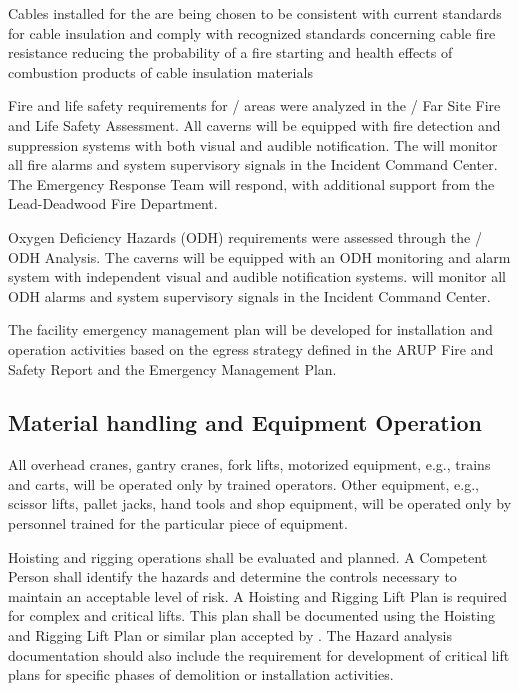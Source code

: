 Cables installed for the  are being chosen to be
consistent with current \fnal standards for cable insulation and
comply with recognized standards concerning cable fire resistance
reducing the probability of a fire starting and health effects of
combustion products of cable insulation materials

Fire and life safety requirements for / areas
were analyzed in the / Far Site Fire and Life
Safety Assessment. All caverns will be equipped with fire detection
and suppression systems with both visual and audible notification. The
\surf will monitor all fire alarms and system supervisory signals in
the \surf Incident Command Center.  The \surf Emergency Response Team
will respond, with additional support from the Lead-Deadwood Fire
Department.

Oxygen Deficiency Hazards (ODH) requirements were assessed through the
/ ODH Analysis. The caverns will be equipped
with an ODH monitoring and alarm system with independent visual and
audible notification systems. \surf will monitor all ODH alarms and
system supervisory signals in the \surf Incident Command Center.

The facility emergency management plan will be developed for
installation and operation activities based on the egress strategy
defined in the ARUP Fire and Safety Report and the \surf Emergency
Management Plan.

\subsection{Material handling and Equipment Operation}

All overhead cranes, gantry cranes, fork lifts, motorized equipment,
e.g., trains and carts, will be operated only by trained
operators. Other equipment, e.g., scissor lifts, pallet jacks, hand
tools and shop equipment, will be operated only by personnel trained
for the particular piece of equipment.

Hoisting and rigging operations shall be evaluated and planned.  A
Competent Person shall identify the hazards and determine the controls
necessary to maintain an acceptable level of risk.  A Hoisting and
Rigging Lift Plan is required for complex and critical lifts. This
plan shall be documented using the \fnal Hoisting and Rigging Lift
Plan or similar plan accepted by \fnal. The Hazard analysis
documentation should also include the requirement for development of
critical lift plans for specific phases of demolition or installation
activities.


